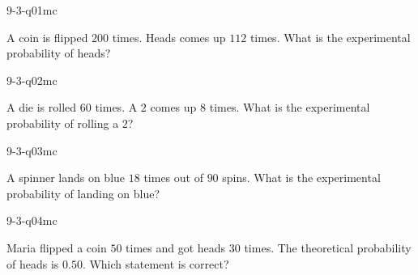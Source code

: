 

\begin{practiceQuestion}{9-3-q01}{mc}
\begin{questionText}
A coin is flipped $200$ times. Heads comes up $112$ times. What is the experimental probability of heads?
\end{questionText}
\end{practiceQuestion}

\begin{practiceQuestion}{9-3-q02}{mc}
\begin{questionText}
A die is rolled $60$ times. A $2$ comes up $8$ times. What is the experimental probability of rolling a $2$?
\end{questionText}
\end{practiceQuestion}

\begin{practiceQuestion}{9-3-q03}{mc}
\begin{questionText}
A spinner lands on blue $18$ times out of $90$ spins. What is the experimental probability of landing on blue?
\end{questionText}
\end{practiceQuestion}

\begin{practiceQuestion}{9-3-q04}{mc}
\begin{questionText}
Maria flipped a coin $50$ times and got heads $30$ times. The theoretical probability of heads is $0.50$. Which statement is correct?
\end{questionText}
\end{practiceQuestion}


